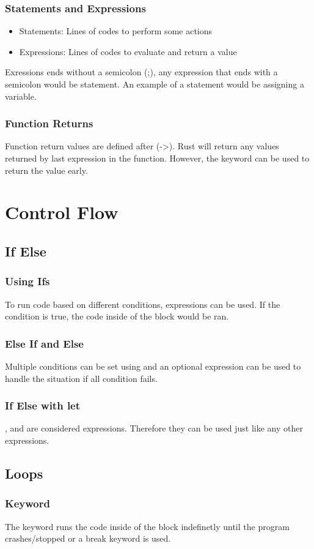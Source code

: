 \documentclass{beamer}
\begin{document}
\begin{frame}
  \frametitle{Statements and Expressions}
  \begin{itemize}
    \item{Statements: Lines of codes to perform some actions}
    \item{Expressions: Lines of codes to evaluate and return a value}
  \end{itemize}
  Exressions ends without a semicolon (;), any expression that ends with a semicolon would be statement. An example of a statement would be assigning a variable.
  
\end{frame}

\begin{frame}
  \frametitle{Function Returns}
  Function return values are defined after (->). Rust will return any values returned by last expression in the function. However, the  keyword can be used to return the value early.
  
\end{frame}

\section{Control Flow}
\subsection{If Else}
\begin{frame}
  \frametitle{Using Ifs}
  To run code based on different conditions,  expressions can be used. If the condition is true, the code inside of the block would be ran.
  
\end{frame}

\begin{frame}
  \frametitle{Else If and Else}
  Multiple conditions can be set using  and an optional  expression can be used to handle the situation if all condition fails.
  
\end{frame}

\begin{frame}
  \frametitle{If Else with let}
  ,  and  are considered expressions. Therefore they can be used just like any other expressions.
  
\end{frame}

\subsection{Loops}
\begin{frame}
  \frametitle{ Keyword}
  The  keyword runs the code inside of the block indefinetly until the program crashes/stopped or a break keyword is used.
  
\end{frame}
\end{document}
